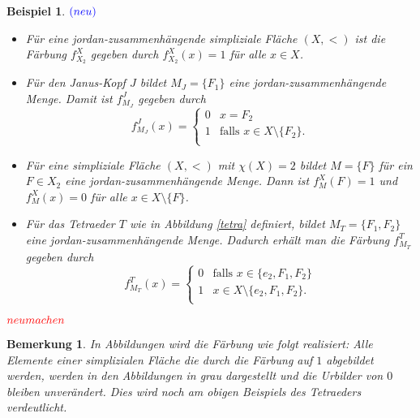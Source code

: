 \documentclass[12pt,titlepage]{article}
\newtheorem{bsp}{Beispiel}[section]
\newtheorem{bemerkung}{Bemerkung}[section]
\begin{document}
\begin{bsp}$\textcolor{blue}{(neu)}$
\begin{itemize}
\item Für eine jordan-zusammenhängende simpliziale Fläche $(X,<)$ ist die Färbung $f^X_{X_2}$ gegeben durch $f_{X_2}^X(x)=1$ für alle $x \in X$.

\item Für den Janus-Kopf $J$ bildet $M_J=\{F_1\}$ eine jordan-zusammenhängende Menge. Damit ist $f^J_{M_J}$ gegeben durch
\[
f^J_{M_J}(x)=\begin{cases}
0 &x=F_2\\
1 & \text{falls } x\in X\setminus \{F_2\}.\\
		\end{cases}
\]
\item Für eine simpliziale Fläche $(X,<)$ mit $\chi(X)=2$ bildet $M=\{F\}$ für ein $F \in X_2$ eine jordan-zusammenhängende Menge. Dann ist $f_M^X(F)=1$ und $f_M^X(x)=0$ für alle $x \in X\setminus \{F\}$.
\item Für das Tetraeder $T$ wie in Abbildung \ref{tetra} definiert, bildet $M_T=\{F_1,F_2\}$ eine jordan-zusammenhängende Menge. Dadurch erhält man die Färbung $f^T_{M_T}$ gegeben durch
\[
f^T_{M_T}(x)=\begin{cases}
		0 & \text{falls } x  \in \{e_2,F_1,F_2\}\\
1 &x \in X\setminus \{e_2,F_1,F_2\}.\\
		\end{cases}
\]

\end{itemize}
\end{bsp}
$\textcolor{red}{neumachen}$
\begin{bemerkung}
In Abbildungen wird die Färbung wie folgt realisiert:
Alle Elemente einer simplizialen Fläche die durch die Färbung auf $1$ abgebildet werden, werden in den Abbildungen in grau dargestellt und die Urbilder von $0$ bleiben unverändert. Dies wird noch am obigen Beispiels des Tetraeders verdeutlicht.
\end{bemerkung}
\end{document}
